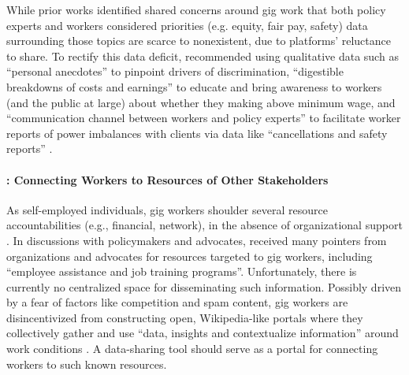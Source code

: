 \label{DR2.1}
{While prior works} \cite{supporting, codesign, zhang2023stakeholder} identified {shared}
 concerns {around gig work that both policy experts and workers considered priorities (e.g. equity, fair pay, safety) }data surrounding those topics are scarce to nonexistent, due to platforms' reluctance to share. 
 {To rectify this data deficit, \citet{supporting} recommended using qualitative data such as ``personal anecdotes'' to pinpoint drivers of discrimination, ``digestible breakdowns of costs and earnings'' to educate and bring awareness to workers (and the public at large) about whether they making above minimum wage, and ``communication channel between workers and policy experts'' to facilitate worker reports of power imbalances with clients via data like ``cancellations and safety reports'' \cite{stein2023you}.}

\paragraph{: \textbf{Connecting Workers to Resources {of Other Stakeholders}}}
\label{DR2.2} 
{As self-employed individuals, gig workers shoulder several resource accountabilities (e.g., financial, network), in the absence of organizational support \cite{accountable}.}
In discussions with policymakers and advocates, \citet{codesign} received many pointers from organizations and advocates for resources targeted to gig workers{, including ``employee assistance and job training programs''}. Unfortunately, there is currently no centralized space for disseminating such information. 
{Possibly driven by a fear of factors like competition and spam content, gig workers are disincentivized from constructing open, Wikipedia-like portals where they collectively gather and use ``data, insights and contextualize information'' around work conditions \cite{stein2023you}.}
{A d}ata-sharing tool should serve as {a portal for} connect{ing} workers to such {known} resources.

